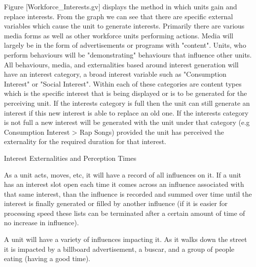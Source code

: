 Figure [Workforce_Interests.gv] displays the method in which units gain and replace interests. From the graph we can see that there are specific external variables which cause the unit to generate interests. Primarily there are various media forms as well as other workforce units performing actions. Media will largely be in the form of advertisements or programs with "content". Units, who perform behaviours will be "demonstrating" behaviours that influence other units. All behaviours, media, and externalities based around interest generation will have an interest category, a broad interest variable such as "Consumption Interest" or "Social Interest". Within each of these categories are content types which is the specific interest that is being displayed or is to be generated for the perceiving unit. If the interests category is full then the unit can still generate an interest if this new interest is able to replace an old one. If the interests category is not full a new interest will be generated with the unit under that category (e.g Consumption Interest > Rap Songs) provided the unit has perceived the externality for the required duration for that interest.

Interest Externalities and Perception Times



As a unit acts, moves, etc, it will have a record of all influences on it. If a unit has an interest slot open each time it comes across an influence associated with that same interest, than the influence is recorded and summed over time until the interest is finally generated or filled by another influence (if it is easier for processing speed these lists can be terminated after a certain amount of time of no increase in influence).


A unit will have a variety of influences impacting it. As it walks down the street it is impacted by a billboard advertisement, a buscar, and a group of people eating (having a good time).

